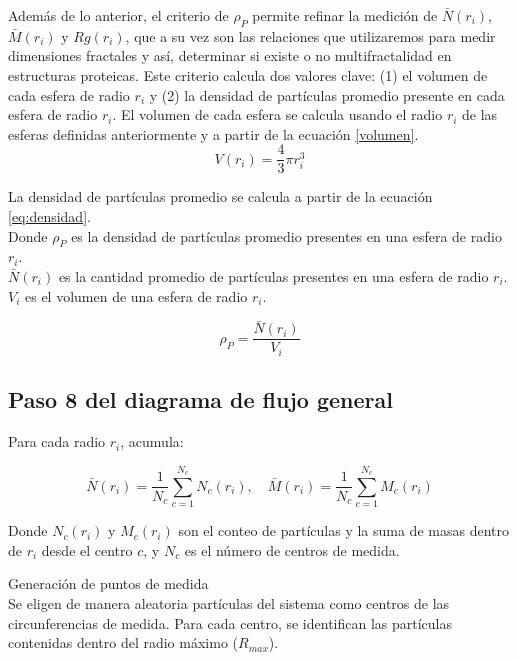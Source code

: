 	  Además de lo anterior, el criterio de \(\rho_{P}\) permite refinar la medici\'{o}n de \( \bar{N}(r_i) \), \( \bar{M}(r_i)\) y \({Rg}(r_i)\), que a su vez son las relaciones que utilizaremos para medir dimensiones fractales y as\'{i}, determinar si existe o no multifractalidad en estructuras proteicas. Este criterio calcula dos valores clave: (1) el volumen de cada esfera de radio \(r_i\) y (2) la densidad de partículas promedio presente en cada esfera de radio \(r_i\). El volumen de cada esfera se calcula usando el radio \(r_i\) de las esferas definidas anteriormente y a partir de la ecuaci\'{o}n \ref{volumen}.\\
	 
	 
	 \begin{equation}
	 	V(r_i) = \frac{4}{3} \pi r_{i}^{3}
	 	\label{volumen}
	 \end{equation}
	 
	 La densidad de part\'{i}culas promedio se calcula a partir de la ecuaci\'{o}n \ref{eq:densidad}. \\
	 Donde \(\rho_{P}\) es la densidad de part\'{i}culas promedio presentes en una esfera de radio \(r_i\).\\
	 \(\bar N(r_{i})\) es la cantidad promedio de part\'{i}culas presentes en una esfera de radio \(r_i\).
	 \(V_{i}\) es el volumen de una esfera de radio \(r_{i}\).
	 
	 \begin{equation}
	 	\rho_P = \frac{\bar N(r_{i})}{V_{i}}
	 	\label{eq:densidad}
	 \end{equation}
	 

	\subsection{Paso 8 del diagrama de flujo general}
 
	Para cada radio \(r_i\), acumula:
	
	\begin{equation}
			\bar{N}(r_i) = \frac{1}{N_c} \sum_{c=1}^{N_c} N_c(r_i), \quad
		\bar{M}(r_i) = \frac{1}{N_c} \sum_{c=1}^{N_c} M_c(r_i)
	\end{equation}

	Donde \(N_c(r_i)\) y \(M_c(r_i)\) son el conteo de partículas y la suma de masas 
	dentro de \(r_i\) desde el centro \(c\), y \(N_c\) es el número de centros de medida.

	 Generaci\'{o}n de puntos de medida\\
	Se eligen de manera aleatoria part\'{i}culas del sistema como centros de las circunferencias de medida. Para cada centro, se identifican las part\'{i}culas contenidas dentro del radio m\'{a}ximo (\(R_{max}\)).
	
